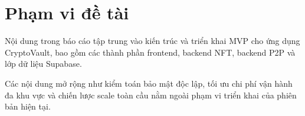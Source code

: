 \documentclass[a4paper,12pt]{report}
\begin{document}
\section{Phạm vi đề tài}
Nội dung trong báo cáo tập trung vào kiến trúc và triển khai MVP cho ứng dụng CryptoVault, bao gồm các thành phần frontend, backend NFT, backend P2P và lớp dữ liệu Supabase.

Các nội dung mở rộng như kiểm toán bảo mật độc lập, tối ưu chi phí vận hành đa khu vực và chiến lược scale toàn cầu nằm ngoài phạm vi triển khai của phiên bản hiện tại.
\end{document}
